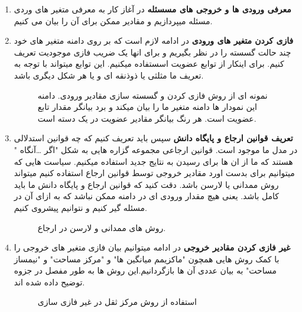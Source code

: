 \documentclass[12pt]{article}
\begin{document}
\begin{enumerate}
    \item {
          \textbf{معرفی ورودی ها و خروجی های مسسئله}
          در آغاز کار به معرفی متغیر های وردی مسئله میپردازیم و مقادیر ممکن برای آن را بیان می کنیم.
          }
    \item {
          \textbf{فازی کردن متغیر های ورودی}
          در ادامه لازم است که بر روی دامنه متغیر های خود چند حالت گسسته را در نظر بگیریم و برای انها یک ضریب فازی موجودیت تعریف کنیم. برای اینکار از توابع عضویت اسستفاده میکنیم. این توابع میتواند با توجه به تعریف ما مثلثی یا ذوذنقه ای و یا هر شکل دیگری باشد.
          }
          \begin{figure}[H]
              \centering
              \begin{center}
              \end{center}
              \caption{نمونه ای از روش فازی کردن و گسسته سازی مقادیر ورودی. دامنه این نمودار ها دامنه متغیر ما را بیان میکند و برد بیانگر مقدار تابع عضویت است. هر رنگ بیانگر مقادیر عضویت در یک دسته است.}
          \end{figure}
    \item {
          \textbf{تعریف قوانین ارجاع و پایگاه دانش}
          سپس باید تعریف کنیم که چه قوانین استدلالی در مدل ما موجود است. قوانین ارجاعی مجموعه گزاره هایی به شکل "اگر \dots  آنگاه " هستند که ما از ان ها برای رسیدن به نتایج جدید استفاده میکنیم. سیاست هایی که میتوانیم برای بدست اورد مقادیر خروجی توسط قوانین ارجاع استفاده کنیم میتواند روش ممدانی یا لارسن باشد. دقت کنید که قوانین ارجاع و پایگاه دانش ما باید کامل باشد. یعنی هیچ مقدار ورودی ای در دامنه ممکن نباشد که به ازای آن در مسئله گیر کنیم و نتوانیم پیشروی کنیم.
          }
          \begin{figure}[H]
              \centering
              \begin{center}
              \end{center}
              \caption{روش های ممدانی و لارسن در ارجاع.}
          \end{figure}
    \item {
          \textbf{غیر فازی کردن مقادیر خروجی}
          در ادامه میتوانیم بیان فازی متغیر های خروجی را با کمک روش هایی همچون "ماکزیمم میانگین ها" و "مرکز مساحت" و "نیمساز مساحت"  به بیان عددی آن ها بازگردانیم.این روش ها به طور مفصل در جزوه توضیح داده شده اند.
          }
          \begin{figure}[H]
              \centering
              \begin{center}
              \end{center}
              \caption{استفاده از روش مرکز ثقل در غیر فازی سازی}
          \end{figure}
\end{enumerate}
\clearpage
\end{document}
